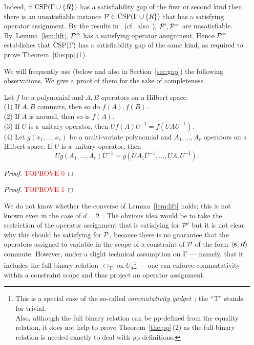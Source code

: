 Indeed, if ${\rm CSP}(\Gamma\cup\{R\})$ has a satisfiability gap of the first or second kind then there is an unsatisfiable instance ${\mathcal P}\in{\rm CSP}(\Gamma\cup\{R\})$ that has a satisfying operator assignment. By the results in~\cite{Bulatov05:classifying} (cf.~also~\cite{BKW17}), ${\mathcal P}',{\mathcal P}^=$ are unsatisfiable. By~Lemma~\ref{lem:lift}, ${\mathcal P}^=$ has a satisfying operator assignment. Hence ${\mathcal P}^=$ establishes that ${\rm CSP}(\Gamma)$ has a satisfiability gap of the same kind, as required to prove Theorem~\ref{the:pp}\,(1).

We will frequently use (below and also in Section~\ref{sec:gap}) the following observations. We give a proof of them for the sake of completeness.

\begin{lemma}\label{lem:matrix-polys}
Let $f$ be a polynomial and $A,B$ operators on a Hilbert space.\\[2mm]
(1) If $A,B$ commute, then so do $f(A),f(B)$.\\
(2) If $A$ is normal, then so is $f(A)$.\\
(3) If $U$ is a unitary operator, then $Uf(A)U^{-1}=f(UAU^{-1})$.\\[1mm]
(4) Let $g(x_1,\dots,x_r)$ be a multi-variate polynomial and $A_1,\dots,A_r$
  operators on a Hilbert space. If $U$ is a unitary operator, then 
\[
Ug(A_1,\dots,A_r)U^{-1}=g(UA_1U^{-1},\dots,UA_rU^{-1}).
\]
\end{lemma}

\begin{proof}\textcolor{red}{TOPROVE 0}\end{proof}




%
\begin{proof}\textcolor{red}{TOPROVE 1}\end{proof}

We do not know whether the converse of Lemma~\ref{lem:lift} holds; this is not known even in the case of $d=2$~\cite{AKS19:jcss}.
%
The obvious idea would be to take the restriction of the operator assignment
that is satisfying for ${\mathcal P}'$ but it is not clear why this should be satisfying
for ${\mathcal P}$, because there is no guarantee that the operators assigned to variable in the scope of a constraint of ${\mathcal P}$ of the form $\langle {\bf s}, R \rangle$ commute. However, under a slight technical assumption on $\Gamma$ --- namely,
that it includes the full binary relation $\rel_T$ on $U_d$\footnote{This is a special case of the
so-called \emph{commutativity gadget}~\cite{AKS19:jcss}; the ``T'' stands for
trivial.\\ Also, although the full binary relation can be pp-defined from the equality relation, it does not help to prove Theorem~\ref{the:pp}\,(2) as the full binary relation is needed exactly to deal with pp-definitions.} --- one can
enforce commutativity within a constraint scope and thus project an operator
assignment. 

